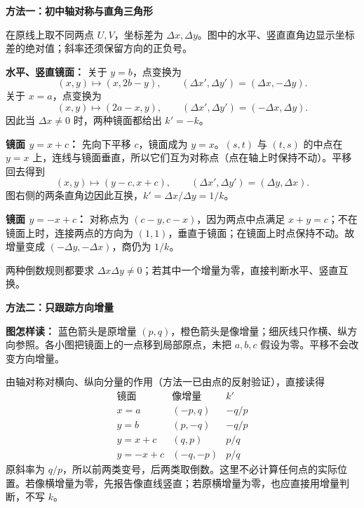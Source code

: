 \clearpage
\begin{proofbox}
\textbf{方法一：初中轴对称与直角三角形}
\begin{center}

\end{center}
在原线上取不同两点 $U,V$，坐标差为 $\Delta x,\Delta y$。图中的水平、竖直直角边显示坐标差的绝对值；斜率还须保留方向的正负号。

\medskip
\textbf{水平、竖直镜面：} 关于 $y=b$，点变换为
\[
(x,y)\mapsto(x,2b-y),\qquad
(\Delta x',\Delta y')=(\Delta x,-\Delta y).
\]
关于 $x=a$，点变换为
\[
(x,y)\mapsto(2a-x,y),\qquad
(\Delta x',\Delta y')=(-\Delta x,\Delta y).
\]
因此当 $\Delta x\ne0$ 时，两种镜面都给出 $k'=-k$。

\medskip
\textbf{镜面 $y=x+c$：} 先向下平移 $c$，镜面成为 $y=x$。$(s,t)$ 与 $(t,s)$ 的中点在 $y=x$ 上，连线与镜面垂直，所以它们互为对称点（点在轴上时保持不动）。平移回去得到
\[
(x,y)\mapsto(y-c,x+c),\qquad
(\Delta x',\Delta y')=(\Delta y,\Delta x).
\]
图右侧的两条直角边因此互换，$k'=\Delta x/\Delta y=1/k$。

\medskip
\textbf{镜面 $y=-x+c$：} 对称点为 $(c-y,c-x)$，因为两点中点满足 $x+y=c$；不在镜面上时，连接两点的方向为 $(1,1)$，垂直于镜面；在镜面上时点保持不动。故增量变成 $(-\Delta y,-\Delta x)$，商仍为 $1/k$。

两种倒数规则都要求 $\Delta x\Delta y\ne0$；若其中一个增量为零，直接判断水平、竖直互换。
\end{proofbox}

\clearpage
\begin{proofbox}
\textbf{方法二：只跟踪方向增量}
\begin{center}

\end{center}
\textbf{图怎样读：} 蓝色箭头是原增量 $(p,q)$，橙色箭头是像增量；细灰线只作横、纵方向参照。各小图把镜面上的一点移到局部原点，未把 $a,b,c$ 假设为零。平移不会改变方向增量。

\medskip
由轴对称对横向、纵向分量的作用（方法一已由点的反射验证），直接读得
\[
\begin{array}{c|c|c}
\text{镜面}&\text{像增量}&k'\\ \hline
x=a&(-p,q)&-q/p\\
y=b&(p,-q)&-q/p\\
y=x+c&(q,p)&p/q\\
y=-x+c&(-q,-p)&p/q
\end{array}
\]
原斜率为 $q/p$，所以前两类变号，后两类取倒数。这里不必计算任何点的实际位置。若像横增量为零，先报告像直线竖直；若原横增量为零，也应直接用增量判断，不写 $k$。
\end{proofbox}

